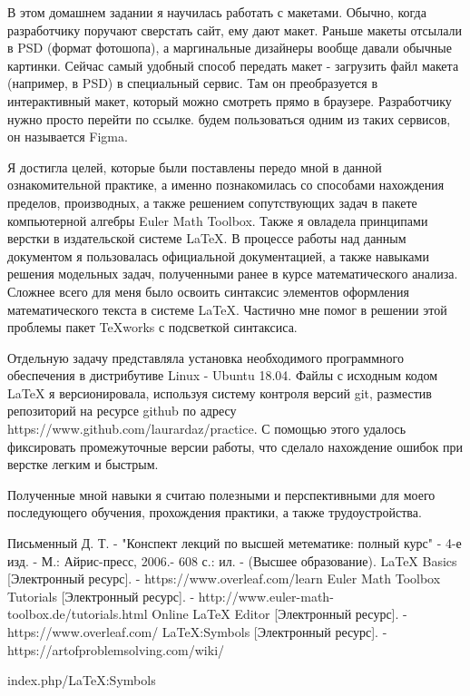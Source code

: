\documentclass[14pt]{extreport}
\begin{document}
В этом домашнем задании я научилась работать с макетами. Обычно, когда разработчику поручают сверстать сайт, ему дают макет. Раньше макеты отсылали в PSD (формат фотошопа), а маргинальные дизайнеры вообще давали обычные картинки. Сейчас самый удобный способ передать макет - загрузить файл макета (например, в PSD) в специальный сервис. Там он преобразуется в интерактивный макет, который можно смотреть прямо в браузере. Разработчику нужно просто перейти по ссылке.  будем пользоваться одним из таких сервисов, он называется Figma.








\conclusions

Я достигла целей, которые были поставлены передо мной в данной ознакомительной практике, а именно познакомилась со способами нахождения пределов, производных, а также решением сопутствующих задач в пакете компьютерной алгебры Euler Math Toolbox. Также я овладела принципами верстки в издательской системе LaTeX.  В процессе работы над данным документом я пользовалась официальной документацией, а также навыками решения модельных задач, полученными ранее в курсе математического  анализа. Сложнее всего для меня было освоить синтаксис элементов оформления математического текста в системе LaTeX. Частично мне помог в решении этой проблемы пакет TeXworks с подсветкой синтаксиса.  

Отдельную задачу представляла установка необходимого программного обеспечения в дистрибутиве Linux - Ubuntu 18.04. Файлы с исходным кодом LaTeX я версионировала, используя систему контроля версий git, разместив репозиторий на ресурсе github по адресу https://www.github.com/laurardaz/practice. С помощью этого удалось фиксировать промежуточные версии работы, что сделало нахождение ошибок при верстке легким и быстрым. 

Полученные мной навыки я считаю полезными и перспективными для моего последующего обучения, прохождения практики, а также трудоустройства.  

\newpage
 

 
\begin{thebibliography}{}
      Письменный Д. Т.  -  "Конспект лекций по высшей метематике: полный курс" - 4-е изд. - М.: Айрис-пресс, 2006.- 608 с.: ил. - (Высшее образование).
      LaTeX Basics [Электронный ресурс]. - https://www.overleaf.com/learn
     Euler Math Toolbox Tutorials [Электронный ресурс]. -  http://www.euler-math-toolbox.de/tutorials.html
    Online LaTeX Editor [Электронный ресурс]. - https://www.overleaf.com/
    LaTeX:Symbols [Электронный ресурс]. - https://artofproblemsolving.com/wiki/

index.php/LaTeX:Symbols

\end{thebibliography}
\end{document}
